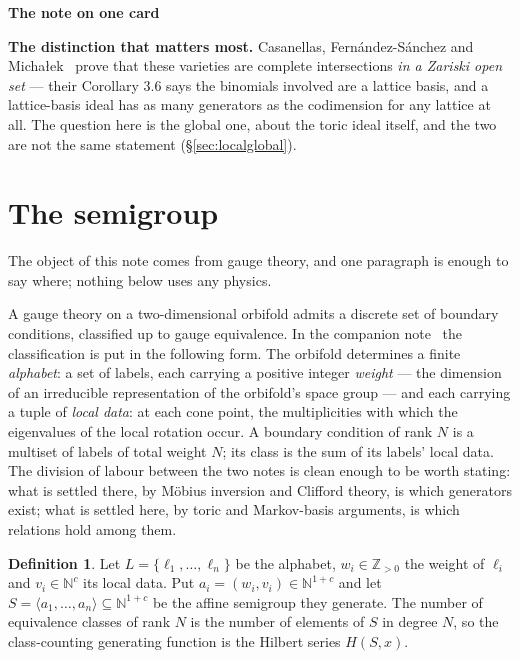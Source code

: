 \documentclass[11pt,a4paper]{article}
\theoremstyle{definition}
\newtheorem{definition}{Definition}
\newcommand{\ZZ}{\mathbb{Z}}
\newcommand{\NN}{\mathbb{N}}
\newenvironment{ficha}[1]{%
  \par\medskip\begin{lrbox}{\fichabox}\begin{minipage}{0.93\textwidth}%
  {\normalsize\bfseries\color{hdrblue}#1}\par\medskip\small%
}{%
  \end{minipage}\end{lrbox}%
  \begin{center}\setlength{\fboxsep}{9pt}%
  \fcolorbox{hdrblue}{softgrey}{\usebox{\fichabox}}\end{center}\par\medskip%
}
\begin{document}
\begin{ficha}{The note on one card}
\smallskip\noindent
\textbf{The distinction that matters most.} Casanellas, Fern\'andez-S\'anchez and
Micha{\l}ek~\cite{CFM} prove that these varieties are complete intersections \emph{in a Zariski open
set} --- their Corollary 3.6 says the binomials involved are a lattice basis, and a lattice-basis
ideal has as many generators as the codimension for any lattice at all. The question here is the
global one, about the toric ideal itself, and the two are not the same statement
(\S\ref{sec:localglobal}).
\end{ficha}

\section{The semigroup}\label{sec:semigroup}

The object of this note comes from gauge theory, and one paragraph is enough to say where; nothing
below uses any physics.

A gauge theory on a two-dimensional orbifold admits a discrete set of boundary conditions,
classified up to gauge equivalence. In the companion note~\cite{IXA} the classification is put in
the following form. The orbifold determines a finite \emph{alphabet}: a set of labels, each carrying
a positive integer \emph{weight} --- the dimension of an irreducible representation of the
orbifold's space group --- and each carrying a tuple of \emph{local data}: at each cone point, the
multiplicities with which the eigenvalues of the local rotation occur. A boundary condition of rank
$N$ is a multiset of labels of total weight $N$; its class is the sum of its labels' local data.
The division of labour between the two notes is clean enough to be worth stating: what is settled
there, by M\"obius inversion and Clifford theory, is which generators exist; what is settled here,
by toric and Markov-basis arguments, is which relations hold among them.

\begin{definition}\label{def:S}
Let $L=\{\ell_1,\dots,\ell_n\}$ be the alphabet, $w_i\in\ZZ_{>0}$ the weight of $\ell_i$ and
$v_i\in\NN^{c}$ its local data. Put $a_i=(w_i,v_i)\in\NN^{1+c}$ and let
$S=\langle a_1,\dots,a_n\rangle\subseteq\NN^{1+c}$ be the affine semigroup they generate. The number
of equivalence classes of rank $N$ is the number of elements of $S$ in degree $N$, so the
class-counting generating function is the Hilbert series $H(S,x)$.
\end{definition}
\end{document}
